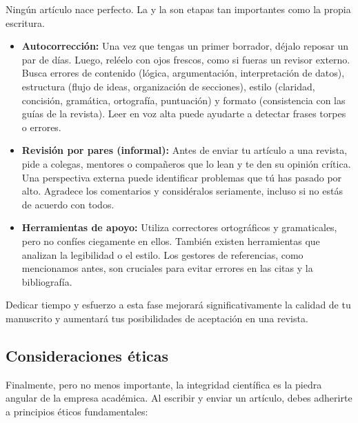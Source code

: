 Ningún artículo nace perfecto. La  y la
 son etapas tan importantes como la propia escritura.

\begin{itemize}
  \item \textbf{Autocorrección:} Una vez que tengas un primer borrador, déjalo
        reposar un par de días.
        Luego, reléelo con ojos frescos, como si fueras un revisor externo.
        Busca errores de contenido (lógica, argumentación, interpretación de
        datos), estructura (flujo de ideas, organización de secciones), estilo
        (claridad, concisión, gramática, ortografía, puntuación) y formato
        (consistencia con las guías de la revista).
        Leer en voz alta puede ayudarte a detectar frases torpes o errores.
  \item \textbf{Revisión por pares (informal):} Antes de enviar tu artículo a
        una revista, pide a colegas, mentores o compañeros que lo lean y te den
        su opinión crítica.
        Una perspectiva externa puede identificar problemas que tú has pasado por
        alto.
        Agradece los comentarios y considéralos seriamente, incluso si no estás
        de acuerdo con todos.
  \item \textbf{Herramientas de apoyo:} Utiliza correctores ortográficos y
        gramaticales, pero no confíes ciegamente en ellos.
        También existen herramientas que analizan la legibilidad o el estilo.
        Los gestores de referencias, como mencionamos antes, son cruciales para
        evitar errores en las citas y la bibliografía.
\end{itemize}
Dedicar tiempo y esfuerzo a esta fase mejorará significativamente la calidad de
tu manuscrito y aumentará tus posibilidades de aceptación en una revista.

\subsection*{Consideraciones éticas}
\label{sub:eticapublicacion}

Finalmente, pero no menos importante, la integridad científica es la piedra
angular de la empresa académica.
Al escribir y enviar un artículo, debes adherirte a principios éticos
fundamentales:


